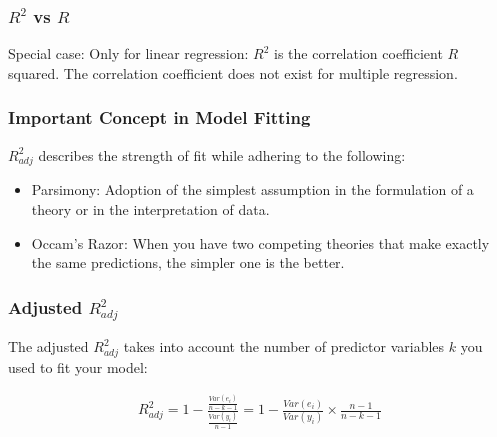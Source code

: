 \documentclass[handout]{beamer}
\newcommand{\blue}[1]{\textcolor{blue2}{#1}}
\begin{document}
\begin{frame}[fragile]
\frametitle{$R^2$ vs $R$}

Special case:  \blue{Only for linear regression}:  $R^2$ is the correlation coefficient $R$ squared.  The correlation coefficient \blue{does not exist} for multiple regression.  

\end{frame}


\begin{frame}[fragile]
\frametitle{Important Concept in Model Fitting}

$R^2_{adj}$ describes the strength of fit while adhering to the following:
\begin{itemize}
\pause\item \blue{Parsimony}:  Adoption of the simplest assumption in the formulation of a theory or in the interpretation of data.
\pause\item \blue{Occam's Razor}: When you have two competing theories that make exactly the same predictions, the simpler one is the better.
\end{itemize}


\end{frame}


\begin{frame}[fragile]
\frametitle{Adjusted $R^2_{adj}$}

%
%
The \blue{adjusted $R^2_{adj}$} takes into account the number of predictor variables $k$ you used to fit your model:  

\begin{eqnarray*}
R^2_{adj} = 1 - \frac{\frac{Var(e_i)}{n-k-1}}{\frac{Var(y_i)}{n-1}} = 1 - \frac{Var(e_i)}{Var(y_i)} \times \frac{n-1}{n-k-1}
\end{eqnarray*}

\end{frame}


%
%
\end{document}
